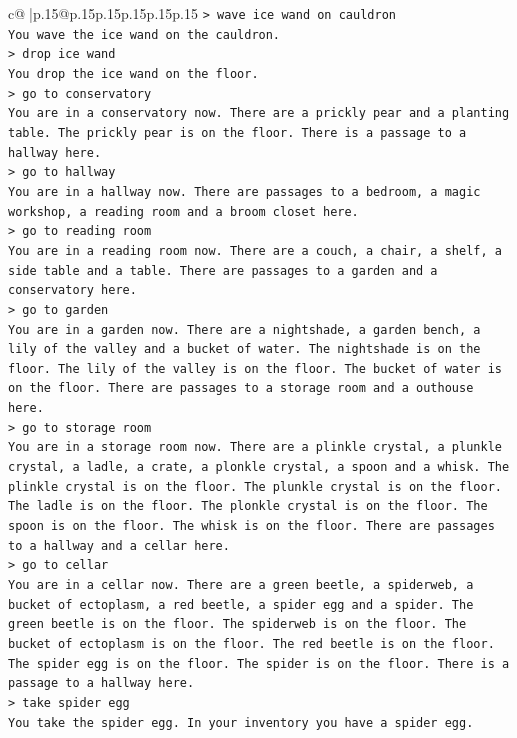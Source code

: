 \documentclass{article}
\begin{document}
{\begin{supertabular}{c@{$\;$}|p{.15\linewidth}@{}p{.15\linewidth}p{.15\linewidth}p{.15\linewidth}p{.15\linewidth}p{.15\linewidth}}
{{{\texttt{> wave ice wand on cauldron} \\
\texttt{You wave the ice wand on the cauldron.} \\
\texttt{> drop ice wand} \\
\texttt{You drop the ice wand on the floor.} \\
\texttt{> go to conservatory} \\
\texttt{You are in a conservatory now. There are a prickly pear and a planting table. The prickly pear is on the floor. There is a passage to a hallway here.} \\
\texttt{> go to hallway} \\
\texttt{You are in a hallway now. There are passages to a bedroom, a magic workshop, a reading room and a broom closet here.} \\
\texttt{> go to reading room} \\
\texttt{You are in a reading room now. There are a couch, a chair, a shelf, a side table and a table. There are passages to a garden and a conservatory here.} \\
\texttt{> go to garden} \\
\texttt{You are in a garden now. There are a nightshade, a garden bench, a lily of the valley and a bucket of water. The nightshade is on the floor. The lily of the valley is on the floor. The bucket of water is on the floor. There are passages to a storage room and a outhouse here.} \\
\texttt{> go to storage room} \\
\texttt{You are in a storage room now. There are a plinkle crystal, a plunkle crystal, a ladle, a crate, a plonkle crystal, a spoon and a whisk. The plinkle crystal is on the floor. The plunkle crystal is on the floor. The ladle is on the floor. The plonkle crystal is on the floor. The spoon is on the floor. The whisk is on the floor. There are passages to a hallway and a cellar here.} \\
\texttt{> go to cellar} \\
\texttt{You are in a cellar now. There are a green beetle, a spiderweb, a bucket of ectoplasm, a red beetle, a spider egg and a spider. The green beetle is on the floor. The spiderweb is on the floor. The bucket of ectoplasm is on the floor. The red beetle is on the floor. The spider egg is on the floor. The spider is on the floor. There is a passage to a hallway here.} \\
\texttt{> take spider egg} \\
\texttt{You take the spider egg. In your inventory you have a spider egg.} \\
}}}
\end{supertabular}}
\end{document}
